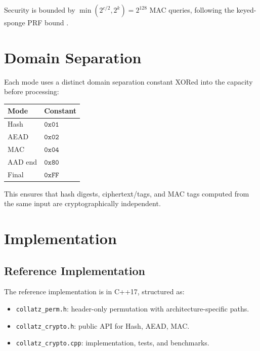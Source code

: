 \documentclass[11pt,a4paper]{article}
\newcommand{\toprule}{\hline}
\newcommand{\midrule}{\hline}
\newcommand{\bottomrule}{\hline}
\begin{document}
Security is bounded by $\min(2^{c/2}, 2^k) = 2^{128}$ MAC queries,
following the keyed-sponge PRF bound \cite{sponge_security}.

\section{Domain Separation}
\label{sec:domain}

Each mode uses a distinct domain separation constant XORed into the
capacity before processing:

\begin{center}
\begin{tabular}{|l|l|}
\toprule
\textbf{Mode} & \textbf{Constant} \\
\midrule
Hash    & $\mathtt{0x01}$ \\
AEAD    & $\mathtt{0x02}$ \\
MAC     & $\mathtt{0x04}$ \\
AAD end & $\mathtt{0x80}$ \\
Final   & $\mathtt{0xFF}$ \\
\bottomrule
\end{tabular}
\end{center}

This ensures that hash digests, ciphertext/tags, and MAC tags computed
from the same input are cryptographically independent.

\section{Implementation}
\label{sec:impl}

\subsection{Reference Implementation}

The reference implementation is in C++17, structured as:
\begin{itemize}
    \item \texttt{collatz\_perm.h}: header-only permutation with
          architecture-specific paths.
    \item \texttt{collatz\_crypto.h}: public API for Hash, AEAD, MAC.
    \item \texttt{collatz\_crypto.cpp}: implementation, tests, and
          benchmarks.
\end{itemize}
\end{document}

